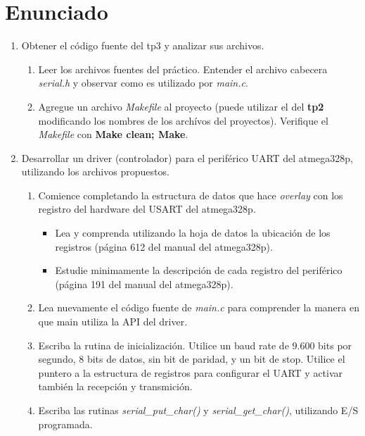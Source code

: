\chapter*{Enunciado}

\begin{enumerate}
      \item
            Obtener el código fuente del tp3 y analizar sus archivos.

            \begin{enumerate}
                  \item Leer los archivos fuentes del práctico. Entender el archivo cabecera \textit{serial.h} y observar como es utilizado por \textit{main.c}.
                  \item Agregue un archivo \textit{Makefile} al proyecto (puede utilizar el del \textbf{tp2} modificando los nombres de los archívos del proyectos). Verifique el \textit{Makefile} con \textbf{Make clean; Make}.
            \end{enumerate}

      \item Desarrollar un driver (controlador) para el periférico UART del atmega328p, utilizando los archivos propuestos.

            \begin{enumerate}
                  \item Comience completando la estructura de datos que hace \textit{overlay} con los registro del hardware del USART del atmega328p.

                        \begin{itemize}
                              \item Lea y comprenda utilizando la hoja de datos la ubicación de los registros (página 612 del manual del atmega328p).
                              \item Estudie minimamente la descripción de cada registro del periférico (página 191 del manual del atmega328p).
                        \end{itemize}
                  \item Lea nuevamente el código fuente de \textit{main.c} para comprender la manera en que main utiliza la API del driver.
                  \item Escriba la rutina de inicialización. Utilice un baud rate de $9.600$ bits por segundo, 8 bits de datos, sin bit de paridad, y un bit de stop. Utilice el puntero a la estructura de registros para configurar el UART y activar también la recepción y transmición.
                  \item Escriba las rutinas \textit{serial\_put\_char()} y \textit{serial\_get\_char()}, utilizando E/S programada.
            \end{enumerate}


\end{enumerate}
